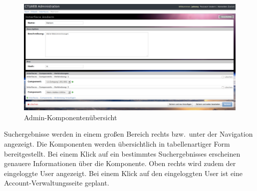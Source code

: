 \begin{itemize}
\begin{description}
        \begin{figure}[!htp]
          \includegraphics[width=0.8\linewidth]{bilder/interface.pdf}
          \caption{Admin-Komponentenübersicht}
          \label{fig:gui}
        \end{figure}
             
      \end{description}
 \end{itemize}
 


Suchergebnisse werden in einem großen Bereich rechts bzw.\ unter der Navigation angezeigt. 
Die Komponenten werden übersichtlich in tabellenartiger Form bereitgestellt. Bei einem Klick auf ein bestimmtes Suchergebnisses erscheinen genauere Informationen über die Komponente. 
Oben rechts wird zudem der eingeloggte User angezeigt.
Bei einem Klick auf den eingeloggten User ist eine Account-Verwaltungsseite geplant.
